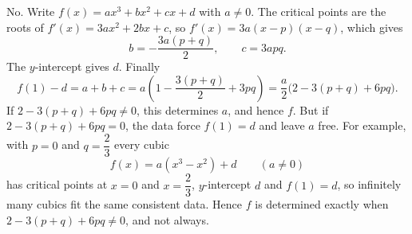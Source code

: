 No. Write $f(x)=ax^3+bx^2+cx+d$ with $a\ne0$. The critical points are the roots of $f'(x)=3ax^2+2bx+c$, so $f'(x)=3a(x-p)(x-q)$, which gives
\[
b=-\dfrac{3a(p+q)}{2},\qquad c=3apq .
\]
The $y$-intercept gives $d$. Finally
\[
f(1)-d=a+b+c=a\left(1-\dfrac{3(p+q)}{2}+3pq\right)=\dfrac{a}{2}\bigl(2-3(p+q)+6pq\bigr).
\]
If $2-3(p+q)+6pq\ne0$, this determines $a$, and hence $f$. But if $2-3(p+q)+6pq=0$, the data force $f(1)=d$ and leave $a$ free. For example, with $p=0$ and $q=\dfrac{2}{3}$ every cubic
\[
f(x)=a\left(x^3-x^2\right)+d\qquad(a\ne0)
\]
has critical points at $x=0$ and $x=\dfrac{2}{3}$, $y$-intercept $d$ and $f(1)=d$, so infinitely many cubics fit the same consistent data. Hence $f$ is determined exactly when $2-3(p+q)+6pq\ne0$, and not always.
